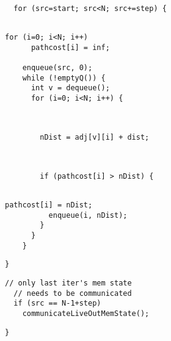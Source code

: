\begin{lstlisting}[morekeywords={pathcost}, aboveskip=0pt,
belowskip=0pt, firstnumber=25,name=dij_checks,showlines=true]

  for (src=start; src<N; src+=step) {


\end{lstlisting}
\begin{lstlisting}[morekeywords={pathcost,dist}, aboveskip=0pt,
belowskip=0pt, firstnumber=28,name=dij_checks,showlines=true]
    for (i=0; i<N; i++)
      pathcost[i] = inf;

    enqueue(src, 0);
    while (!emptyQ()) {
      int v = dequeue();
      for (i=0; i<N; i++) {
\end{lstlisting}
\begin{lstlisting}[morekeywords={pathcost,dist}, aboveskip=0pt,
belowskip=0pt, firstnumber=auto,name=dij_checks,showlines=true]


        nDist = adj[v][i] + dist;
\end{lstlisting}
\begin{lstlisting}[morekeywords={pathcost}, aboveskip=0pt,
belowskip=0pt, firstnumber=auto,name=dij_checks,showlines=true]


        if (pathcost[i] > nDist) {


\end{lstlisting}
\begin{lstlisting}[morekeywords={pathcost}, aboveskip=0pt,
belowskip=0pt, firstnumber=auto,name=dij_checks]
          pathcost[i] = nDist;
          enqueue(i, nDist);
        }
      }
    }
\end{lstlisting}

\begin{lstlisting}[morekeywords={pathcost,dist}, aboveskip=0pt,
belowskip=0pt, firstnumber=auto,name=dij_checks,showlines=true]
  }

\end{lstlisting}

\begin{lstlisting}[morekeywords={pathcost},
aboveskip=0pt,belowskip=0pt,backgroundcolor=\color{lightgray},
firstnumber=auto, name=dij_checks,showlines=true]
  // only last iter's mem state
  // needs to be communicated
  if (src == N-1+step)
    communicateLiveOutMemState();
\end{lstlisting}

\begin{lstlisting}[morekeywords={pathcost}, aboveskip=0pt,
belowskip=0pt, firstnumber=auto,name=dij_checks]
}
\end{lstlisting}
